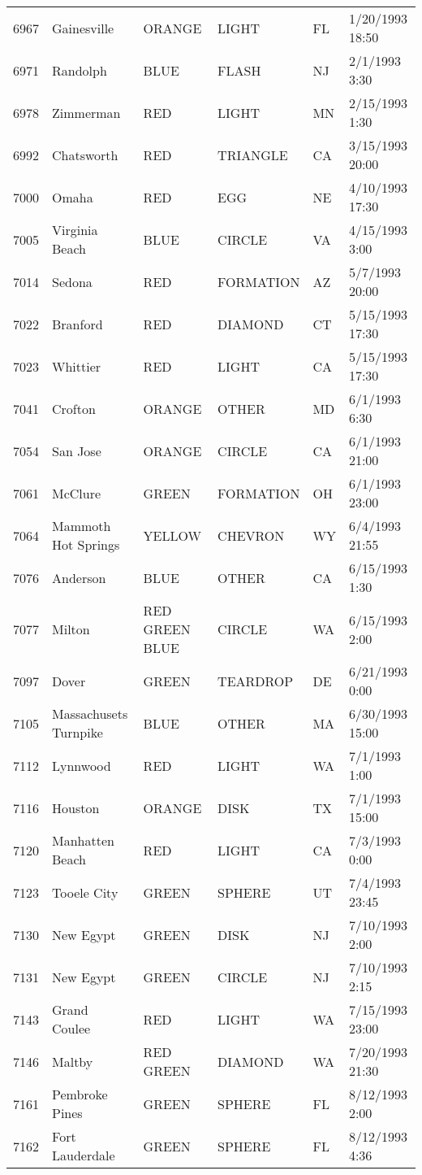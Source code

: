 \begin{tabular}{llllll}
6967 & Gainesville & ORANGE & LIGHT & FL & 1/20/1993 18:50 \\
6971 & Randolph & BLUE & FLASH & NJ & 2/1/1993 3:30 \\
6978 & Zimmerman & RED & LIGHT & MN & 2/15/1993 1:30 \\
6992 & Chatsworth & RED & TRIANGLE & CA & 3/15/1993 20:00 \\
7000 & Omaha & RED & EGG & NE & 4/10/1993 17:30 \\
7005 & Virginia Beach & BLUE & CIRCLE & VA & 4/15/1993 3:00 \\
7014 & Sedona & RED & FORMATION & AZ & 5/7/1993 20:00 \\
7022 & Branford & RED & DIAMOND & CT & 5/15/1993 17:30 \\
7023 & Whittier & RED & LIGHT & CA & 5/15/1993 17:30 \\
7041 & Crofton & ORANGE & OTHER & MD & 6/1/1993 6:30 \\
7054 & San Jose & ORANGE & CIRCLE & CA & 6/1/1993 21:00 \\
7061 & McClure & GREEN & FORMATION & OH & 6/1/1993 23:00 \\
7064 & Mammoth Hot Springs & YELLOW & CHEVRON & WY & 6/4/1993 21:55 \\
7076 & Anderson & BLUE & OTHER & CA & 6/15/1993 1:30 \\
7077 & Milton & RED GREEN BLUE & CIRCLE & WA & 6/15/1993 2:00 \\
7097 & Dover & GREEN & TEARDROP & DE & 6/21/1993 0:00 \\
7105 & Massachusets Turnpike & BLUE & OTHER & MA & 6/30/1993 15:00 \\
7112 & Lynnwood & RED & LIGHT & WA & 7/1/1993 1:00 \\
7116 & Houston & ORANGE & DISK & TX & 7/1/1993 15:00 \\
7120 & Manhatten Beach & RED & LIGHT & CA & 7/3/1993 0:00 \\
7123 & Tooele City & GREEN & SPHERE & UT & 7/4/1993 23:45 \\
7130 & New Egypt & GREEN & DISK & NJ & 7/10/1993 2:00 \\
7131 & New Egypt & GREEN & CIRCLE & NJ & 7/10/1993 2:15 \\
7143 & Grand Coulee & RED & LIGHT & WA & 7/15/1993 23:00 \\
7146 & Maltby & RED GREEN & DIAMOND & WA & 7/20/1993 21:30 \\
7161 & Pembroke Pines & GREEN & SPHERE & FL & 8/12/1993 2:00 \\
7162 & Fort Lauderdale & GREEN & SPHERE & FL & 8/12/1993 4:36 \\

\end{tabular}

